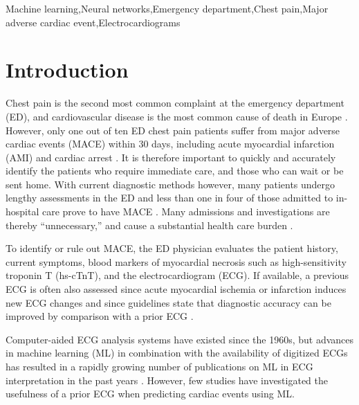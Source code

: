 \documentclass[preprint]{elsarticle}
\begin{document}
\begin{frontmatter}
\begin{keyword}
Machine learning\sep Neural networks\sep Emergency department\sep Chest pain\sep Major adverse cardiac event\sep Electrocardiograms
\end{keyword}

\end{frontmatter}



\section{Introduction}
\label{sec:introduction}
Chest pain is the second most common complaint at the emergency department (ED), and cardiovascular disease is the most common cause of death in Europe \citep{timmis2022}. However, only one out of ten ED chest pain patients suffer from major adverse cardiac events (MACE) within 30 days, including acute myocardial infarction (AMI) and cardiac arrest \citep{mokhtari2016}. It is therefore important to quickly and accurately identify the patients who require immediate care, and those who can wait or be sent home. With current diagnostic methods however, many patients undergo lengthy assessments in the ED and less than one in four of those admitted to in-hospital care prove to have MACE \citep{????}. Many admissions and investigations are thereby ``unnecessary,'' and cause a substantial health care burden \citep{cullen2015}.

To identify or rule out MACE, the ED physician evaluates the patient history, current symptoms, blood markers of myocardial necrosis such as high-sensitivity troponin T (hs-cTnT), and the electrocardiogram (ECG). If available, a previous ECG is often also assessed since acute myocardial ischemia or infarction induces new ECG changes and since guidelines state that diagnostic accuracy can be improved by comparison with a prior ECG \citep{anderson2013,lee1990}.

Computer-aided ECG analysis systems have existed since the 1960s, but advances in machine learning (ML) in combination with the availability of digitized ECGs has resulted in a rapidly growing number of publications on ML in ECG interpretation in the past years \citep{pipberger1961,ansari2017,liu2021}. However, few studies have investigated the usefulness of a prior ECG when predicting cardiac events using ML. 
\end{document}
